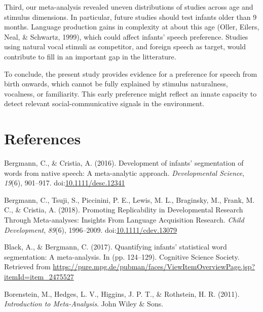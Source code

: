 \documentclass[man]{apa6}
\begin{document}
Third, our meta-analysis revealed uneven distributions of studies across
age and stimulus dimensions. In particular, future studies should test
infants older than 9 months. Language production gains in complexity at
about this age (Oller, Eilers, Neal, \& Schwartz, 1999), which could
affect infants' speech preference. Studies using natural vocal stimuli
as competitor, and foreign speech as target, would contribute to fill in
an important gap in the litterature.

To conclude, the present study provides evidence for a preference for
speech from birth onwards, which cannot be fully explained by stimulus
naturalness, vocalness, or familiarity. This early preference might
reflect an innate capacity to detect relevant social-communicative
signals in the environment.

\newpage

\section{References}\label{references}

\begingroup
\setlength{\parindent}{-0.5in} \setlength{\leftskip}{0.5in}

\hypertarget{refs}{}
\hypertarget{ref-bergmann_development_2016}{}
Bergmann, C., \& Cristia, A. (2016). Development of infants'
segmentation of words from native speech: A meta-analytic approach.
\emph{Developmental Science}, \emph{19}(6), 901--917.
doi:\href{https://doi.org/10.1111/desc.12341}{10.1111/desc.12341}

\hypertarget{ref-bergmann_promoting_2018}{}
Bergmann, C., Tsuji, S., Piccinini, P. E., Lewis, M. L., Braginsky, M.,
Frank, M. C., \& Cristia, A. (2018). Promoting Replicability in
Developmental Research Through Meta-analyses: Insights From Language
Acquisition Research. \emph{Child Development}, \emph{89}(6),
1996--2009.
doi:\href{https://doi.org/10.1111/cdev.13079}{10.1111/cdev.13079}

\hypertarget{ref-black_quantifying_2017}{}
Black, A., \& Bergmann, C. (2017). Quantifying infants' statistical word
segmentation: A meta-analysis. In (pp. 124--129). Cognitive Science
Society. Retrieved from
\url{https://pure.mpg.de/pubman/faces/ViewItemOverviewPage.jsp?itemId=item_2475527}

\hypertarget{ref-borenstein_introduction_2011}{}
Borenstein, M., Hedges, L. V., Higgins, J. P. T., \& Rothstein, H. R.
(2011). \emph{Introduction to Meta-Analysis}. John Wiley \& Sons.
\end{document}

